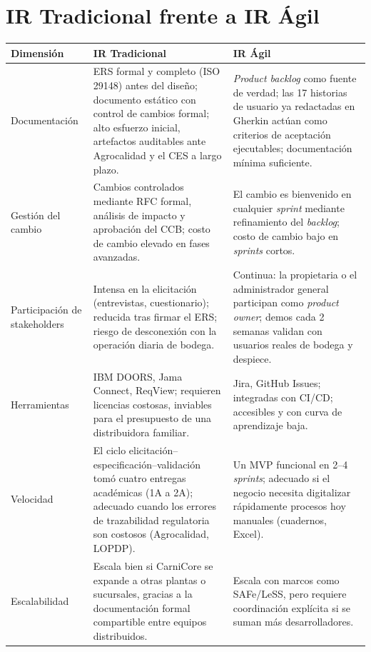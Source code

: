 \documentclass[11pt,a4paper]{article}
\begin{document}
\section{IR Tradicional frente a IR Ágil}
\begin{longtable}{|p{2.4cm}|p{5.7cm}|p{5.7cm}|}
\hline
\textbf{Dimensión} & \textbf{IR Tradicional} & \textbf{IR Ágil} \\
\hline
Documentación & ERS formal y completo (ISO 29148) antes del diseño; documento estático con control de cambios formal; alto esfuerzo inicial, artefactos auditables ante Agrocalidad y el CES a largo plazo. & \textit{Product backlog} como fuente de verdad; las 17 historias de usuario ya redactadas en Gherkin actúan como criterios de aceptación ejecutables; documentación mínima suficiente. \\
\hline
Gestión del cambio & Cambios controlados mediante RFC formal, análisis de impacto y aprobación del CCB; costo de cambio elevado en fases avanzadas. & El cambio es bienvenido en cualquier \textit{sprint} mediante refinamiento del \textit{backlog}; costo de cambio bajo en \textit{sprints} cortos. \\
\hline
Participación de stakeholders & Intensa en la elicitación (entrevistas, cuestionario); reducida tras firmar el ERS; riesgo de desconexión con la operación diaria de bodega. & Continua: la propietaria o el administrador general participan como \textit{product owner}; demos cada 2 semanas validan con usuarios reales de bodega y despiece. \\
\hline
Herramientas & IBM DOORS, Jama Connect, ReqView; requieren licencias costosas, inviables para el presupuesto de una distribuidora familiar. & Jira, GitHub Issues; integradas con CI/CD; accesibles y con curva de aprendizaje baja. \\
\hline
Velocidad & El ciclo elicitación--especificación--validación tomó cuatro entregas académicas (1A a 2A); adecuado cuando los errores de trazabilidad regulatoria son costosos (Agrocalidad, LOPDP). & Un MVP funcional en 2--4 \textit{sprints}; adecuado si el negocio necesita digitalizar rápidamente procesos hoy manuales (cuadernos, Excel). \\
\hline
Escalabilidad & Escala bien si CarniCore se expande a otras plantas o sucursales, gracias a la documentación formal compartible entre equipos distribuidos. & Escala con marcos como SAFe/LeSS, pero requiere coordinación explícita si se suman más desarrolladores. \\
\hline
\end{longtable}
\end{document}
